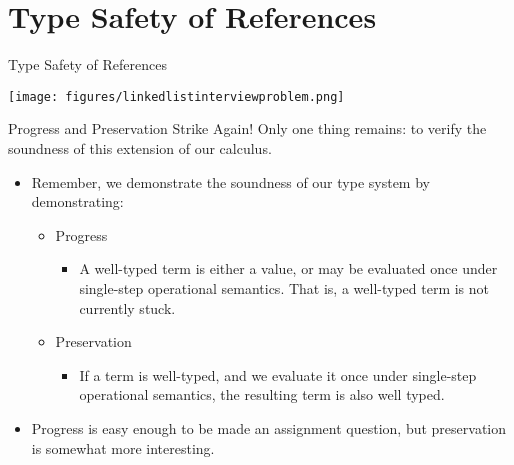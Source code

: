 \documentclass[11pt]{beamer}
\begin{document}
\section[Safety]{Type Safety of References}
\begin{frame}[fragile=singleslide]{Type Safety of References}
\begin{center}
\texttt{[image: figures/linkedlistinterviewproblem.png]} 

\end{center}
\end{frame}

\begin{frame}[fragile=singleslide]{Progress and Preservation Strike Again! }
Only one thing remains: to verify the soundness of this extension of our calculus.  
\begin{itemize}
\item Remember, we demonstrate the soundness of our type system by demonstrating:
\begin{itemize}
\item Progress
\begin{itemize}
\item A well-typed term is either a value, or may be evaluated once under single-step operational semantics.  That is, a well-typed term is not currently stuck.  
\end{itemize}
\item Preservation
\begin{itemize}
\item If a term is well-typed, and we evaluate it once under single-step operational semantics, the resulting term is also well typed.  
\end{itemize}
\end{itemize}
\item Progress is easy enough to be made an assignment question, but preservation is somewhat more interesting.  
\end{itemize}
\end{frame}
\end{document}
